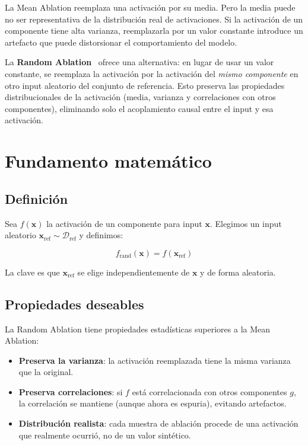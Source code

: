 \documentclass[11pt,a4paper]{report}
\theoremstyle{definition}
\begin{document}
La Mean Ablation reemplaza una activación por su media. Pero la media puede no ser representativa de la distribución real de activaciones. Si la activación de un componente tiene alta varianza, reemplazarla por un valor constante introduce un artefacto que puede distorsionar el comportamiento del modelo.

La \textbf{Random Ablation}~\cite{redwood2022causalscrubbing} ofrece una alternativa: en lugar de usar un valor constante, se reemplaza la activación por la activación del \emph{mismo componente} en otro input aleatorio del conjunto de referencia. Esto preserva las propiedades distribucionales de la activación (media, varianza y correlaciones con otros componentes), eliminando solo el acoplamiento causal entre el input y esa activación.

\section{Fundamento matemático}

\subsection{Definición}

Sea $f(\mathbf{x})$ la activación de un componente para input $\mathbf{x}$. Elegimos un input aleatorio $\mathbf{x}_\text{ref} \sim \mathcal{D}_\text{ref}$ y definimos:

\[
f_{\text{rand}}(\mathbf{x}) = f(\mathbf{x}_{\text{ref}})
\]

La clave es que $\mathbf{x}_{\text{ref}}$ se elige independientemente de $\mathbf{x}$ y de forma aleatoria.

\subsection{Propiedades deseables}

La Random Ablation tiene propiedades estadísticas superiores a la Mean Ablation:

\begin{itemize}
    \item \textbf{Preserva la varianza}: la activación reemplazada tiene la misma varianza que la original.
    \item \textbf{Preserva correlaciones}: si $f$ está correlacionada con otros componentes $g$, la correlación se mantiene (aunque ahora es espuria), evitando artefactos.
    \item \textbf{Distribución realista}: cada muestra de ablación procede de una activación que realmente ocurrió, no de un valor sintético.
\end{itemize}
\end{document}
